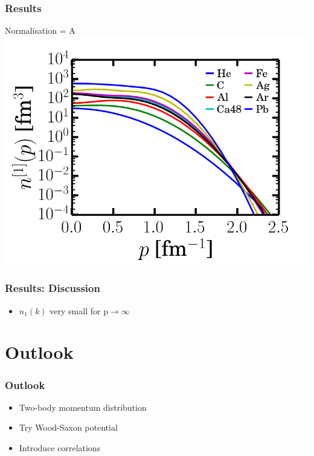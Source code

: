 \documentclass{beamer}
\begin{document}
\begin{frame}
\frametitle{Results}
Normalisation = A
\includegraphics[scale=0.5]{overview.png} 
\end{frame}

\begin{frame}
\frametitle{Results: Discussion}
\begin{itemize}
\item $n_1(k)$ very small for p$\rightarrow \infty$  
\end{itemize}
\end{frame}

\section{Outlook}
\begin{frame}
\frametitle{Outlook}
\begin{itemize}
\item Two-body momentum distribution
\item Try Wood-Saxon potential
\item Introduce correlations
\end{itemize}
\end{frame}
\end{document}
